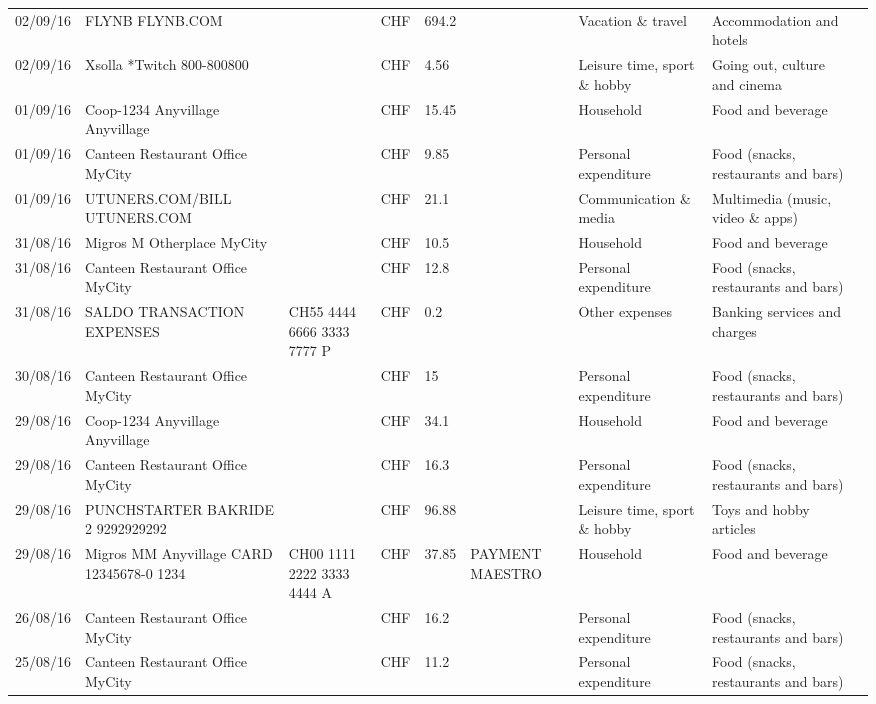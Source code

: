 \begin{landscape}
\begin{tiny}
\begin{longtable}{lp{4cm}llllp{3cm}ll}
		    02/09/16 & FLYNB                   FLYNB.COM &       & CHF   & 694.2 &       & Vacation \& travel & Accommodation and hotels \\
		    02/09/16 & Xsolla *Twitch           800-800800 &       & CHF   & 4.56  &       & Leisure time, sport \& hobby & Going out, culture and cinema \\
		    01/09/16 & Coop-1234 Anyvillage    Anyvillage &       & CHF   & 15.45 &       & Household & Food and beverage \\
		    01/09/16 & Canteen Restaurant Office      MyCity &       & CHF   & 9.85  &       & Personal expenditure & Food (snacks, restaurants and bars) \\
		    01/09/16 & UTUNERS.COM/BILL          UTUNERS.COM &       & CHF   & 21.1  &       & Communication \& media & Multimedia (music, video \& apps) \\
		    31/08/16 & Migros M Otherplace   MyCity &       & CHF   & 10.5  &       & Household & Food and beverage \\
		    31/08/16 & Canteen Restaurant Office      MyCity &       & CHF   & 12.8  &       & Personal expenditure & Food (snacks, restaurants and bars) \\
		    31/08/16 & SALDO TRANSACTION EXPENSES & CH55 4444 6666 3333 7777 P & CHF   & 0.2   &       & Other expenses & Banking services and charges \\
		    30/08/16 & Canteen Restaurant Office      MyCity &       & CHF   & 15    &       & Personal expenditure & Food (snacks, restaurants and bars) \\
		    29/08/16 & Coop-1234 Anyvillage    Anyvillage &       & CHF   & 34.1  &       & Household & Food and beverage \\
		    29/08/16 & Canteen Restaurant Office      MyCity &       & CHF   & 16.3  &       & Personal expenditure & Food (snacks, restaurants and bars) \\
		    29/08/16 & PUNCHSTARTER BAKRIDE 2   9292929292 &       & CHF   & 96.88 &       & Leisure time, sport \& hobby & Toys and hobby articles \\
		    29/08/16 & Migros MM Anyvillage CARD 12345678-0 1234 & CH00 1111 2222 3333 4444 A & CHF   & 37.85 & PAYMENT MAESTRO & Household & Food and beverage \\
		    26/08/16 & Canteen Restaurant Office      MyCity &       & CHF   & 16.2  &       & Personal expenditure & Food (snacks, restaurants and bars) \\
		    25/08/16 & Canteen Restaurant Office      MyCity &       & CHF   & 11.2  &       & Personal expenditure & Food (snacks, restaurants and bars) \\

\end{longtable}
\end{tiny}
\end{landscape}
